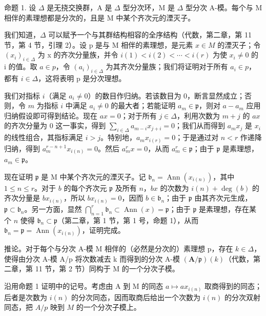 命题 1. 设 \(\Delta\) 是无挠交换群，A 是 \(\Delta\) 型分次环，M 是 \(\Delta\) 型分次 A-模。每个与 M 相伴的素理想都是分次的，且是 M 中某个齐次元的湮灭子。

我们知道，\(\Delta\) 可以赋予一个与其群结构相容的全序结构（代数，第二章，第 11 节，第 4 节，引理 2）。设 p 是与 M 相伴的素理想，是元素 \(x \in M\) 的湮灭子；令 \((x_{i})_{i \in \Delta}\) 为 x 的齐次分量族，并令 \(i(1) < i(2) < \cdots < i(r)\) 为使 \(x_{i} \neq 0\) 的 i 的值。取 \(a \in p\)，令 \((a_{i})_{i \in \Delta}\) 为其齐次分量族；我们将证明对于所有 \(a_{i} \in p\)，都有 \(i \in \Delta\)，这将表明 p 是分次理想。

  我们对指标 \(i\)（满足 \(a_{i} \neq 0\)）的数目作归纳。若该数目为 0，断言显然成立；否则，令 \(m\) 为指标 \(i\) 中满足 \(a_{i} \neq 0\) 的最大者；若能证明 \(a_{m} \in \mathfrak{p}\)，则对 \(a - a_{m}\) 应用归纳假设即可得到结论。现在 \(ax = 0\)；对于所有 \(j \in \Delta\)，利用次数为 \(m + j\) 的 \(ax\) 的齐次分量为 0 这一事实，得到 \(\sum_{i \in \Delta} a_{m - i} x_{j + i} = 0\)；我们从而得到 \(a_{m} x_{j}\) 是 \(x_{i}\) 的线性组合，其指标满足 \(i > j\)。特别地，\(a_{m} x_{i(r)} = 0\)；于是通过对 \(n < r\) 作递降归纳，得到 \(a_{m}^{r - n + 1} x_{i(n)} = 0\)。然后 \(a_{m}^{r} x = 0\)，从而 \(a_{m}^{r} \in \mathfrak{p}\)；由于 \(\mathfrak{p}\) 是素理想，\(a_{m} \in \mathfrak{p}\)。

  现在证明 \(\mathfrak{p}\) 是 M 中某个齐次元的湮灭子。记 \(\mathfrak{b}_n = \operatorname{Ann}(x_{i(n)})\)，其中 \(1 \leqslant n \leqslant r\)。对于 \(b\) 的每个齐次元 \(\mathfrak{p}\) 及所有 \(n\)，\(bx\) 的次数为 \(i(n) + \deg(b)\) 的齐次分量是 \(bx_{i(n)}\)，所以 \(bx_{i(n)} = 0\)，因而 \(b \in \mathfrak{b}_n\)；由于 \(\mathfrak{p}\) 由其齐次元生成，\(\mathfrak{p} \subset \mathfrak{b}_n\)。另一方面，显然 \(\bigcap_{n=1}^{r} \mathfrak{b}_n \subset \operatorname{Ann}(x) = \mathfrak{p}\)；由于 \(\mathfrak{p}\) 是素理想，存在某个 \(n\) 使得 \(\mathfrak{b}_n \subset \mathfrak{p}\)（第二章，第 1 节，第 1 号，命题 1），从而 \(\mathfrak{b}_n = \mathfrak{p} = \operatorname{Ann}(x_{i(n)})\)，证明完成。

推论。对于每个与分次 A-模 M 相伴的（必然是分次的）素理想 p，存在 \(k \in \Delta\)，使得由分次 A-模 A/p 将次数减去 k 而得到的分次 A-模 \((\mathbf{A}/\mathfrak{p})(k)\)（代数，第二章，第 11 节，第 2 节）同构于 M 的一个分次子模。

  沿用命题 1 证明中的记号。考虑由 A 到 M 的同态 \(a \mapsto ax_{i(n)}\) 取商得到的同态；后者是次数为 \(i(n)\) 的分次同态，因而取商后给出一个次数为 \(i(n)\) 的分次双射同态，把 \(A / p\) 映到 \(M\) 的一个分次子模上。

